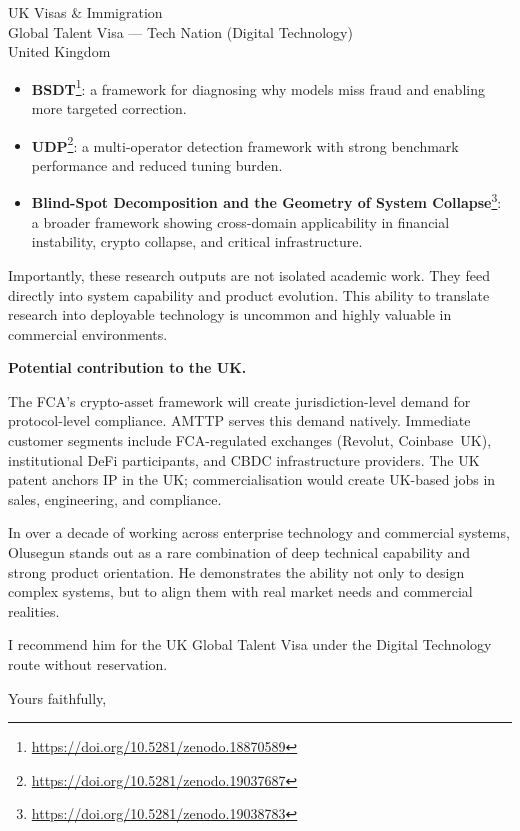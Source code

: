 \documentclass[12pt,a4paper]{letter}
\begin{document}
\begin{letter}{UK Visas \& Immigration\\
Global Talent Visa --- Tech Nation (Digital Technology)\\
United Kingdom}
\begin{itemize}[nosep,leftmargin=*]
  \item \textbf{BSDT}\footnote{\url{https://doi.org/10.5281/zenodo.18870589}}:
    a framework for diagnosing why models miss fraud and enabling more
    targeted correction.
  \item \textbf{UDP}\footnote{\url{https://doi.org/10.5281/zenodo.19037687}}:
    a multi-operator detection framework with strong benchmark
    performance and reduced tuning burden.
  \item \textbf{Blind-Spot Decomposition and the Geometry of System
    Collapse}\footnote{\url{https://doi.org/10.5281/zenodo.19038783}}:
    a broader framework showing cross-domain applicability in financial
    instability, crypto collapse, and critical infrastructure.
\end{itemize}

Importantly, these research outputs are not isolated academic work.
They feed directly into system capability and product evolution.  This
ability to translate research into deployable technology is uncommon and
highly valuable in commercial environments.


\textbf{Potential contribution to the UK.}

The FCA's crypto-asset framework will create jurisdiction-level demand
for protocol-level compliance.  AMTTP serves this demand natively.
Immediate customer segments include FCA-regulated exchanges (Revolut,
Coinbase~UK), institutional DeFi participants, and CBDC infrastructure
providers.  The UK patent anchors IP in the UK; commercialisation would
create UK-based jobs in sales, engineering, and compliance.

In over a decade of working across enterprise technology and commercial
systems, Olusegun stands out as a rare combination of deep technical
capability and strong product orientation.  He demonstrates the ability
not only to design complex systems, but to align them with real market
needs and commercial realities.

I recommend him for the UK Global Talent Visa under the Digital
Technology route without reservation.

\vspace{1.5\baselineskip}

\closing{Yours faithfully,}

\end{letter}
\end{document}
